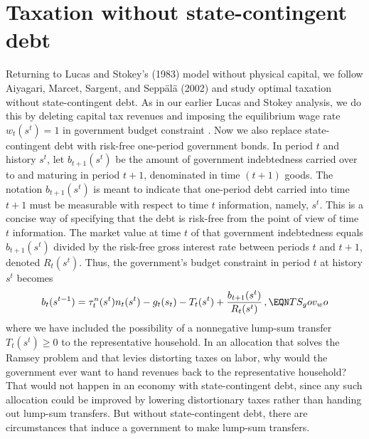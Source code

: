 \section{Taxation without state-contingent debt}\label{sec:AMSS}%
Returning to Lucas and Stokey's (1983) model without physical capital,
we follow Aiyagari, Marcet, Sargent, and Sepp\"al\"a (2002)
and study optimal taxation without state-contingent debt.
As in our earlier Lucas and Stokey analysis, we do this by deleting
capital tax revenues and imposing the equilibrium wage rate
$w_t(s^t)=1$ in government budget constraint . Now we also  replace
state-contingent debt with risk-free one-period government bonds. In period $t$
and history $s^t$, let $b_{t+1}(s^t)$ be the amount of government indebtedness
carried over to and maturing in period $t+1$, denominated in time $(t+1)$ goods. The notation $b_{t+1}(s^t)$  is meant
to indicate that one-period debt carried into time $t+1$ must be measurable with respect to time $t$ information, namely, $s^t$.
This is a concise way of specifying that the debt is risk-free from the point of view of time $t$ information. The
market value at time $t$ of that government indebtedness equals
$b_{t+1}(s^t)$ divided by the risk-free gross interest rate between periods $t$
and $t+1$, denoted  $R_t(s^t)$.  Thus,
the government's budget constraint in period $t$ at history $s^t$ becomes
$$
 b_t(s^{t-1}) =    \tau^n_t(s^t) n_t(s^t) - g_t(s_t) - T_t(s^t)
                    + {b_{t+1}(s^t) \over R_t(s^t )}\,,
              \EQN TS_gov_wo
$$
where we have included the possibility of a nonnegative lump-sum
transfer $T_t(s^t) \geq 0 $ to the representative household.
 In an  allocation that solves the Ramsey problem and  that
levies distorting  taxes on labor, why would the government ever want to
   hand revenues back to the representative household? That would not  happen in an economy
with state-contingent debt, since any such allocation could be improved
by lowering distortionary taxes rather than handing out lump-sum
transfers. But  without state-contingent debt,   there are circumstances that induce  a government  to make lump-sum
transfers.

